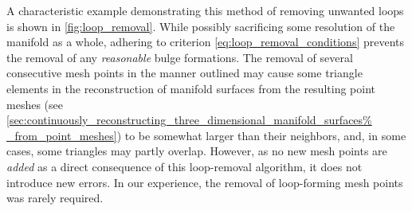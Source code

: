 A characteristic example demonstrating this method of removing unwanted
loops is shown in \cref{fig:loop_removal}. While possibly sacrificing some
resolution of the manifold as a whole, adhering to criterion
\eqref{eq:loop_removal_conditions} prevents the removal of any \emph{reasonable}
bulge formations. The removal of several consecutive mesh
points in the manner outlined may cause some triangle elements in the
reconstruction of manifold surfaces from the resulting point meshes (see
\cref{sec:continuously_reconstructing_three_dimensional_manifold_surfaces%
_from_point_meshes}) to be somewhat larger than their neighbors, and, in some
cases, some triangles may partly overlap. However, as no new mesh points are
\emph{added} as a direct consequence of this loop-removal algorithm, it does
not introduce new errors. In our experience, the removal of
loop-forming mesh points was rarely required.


